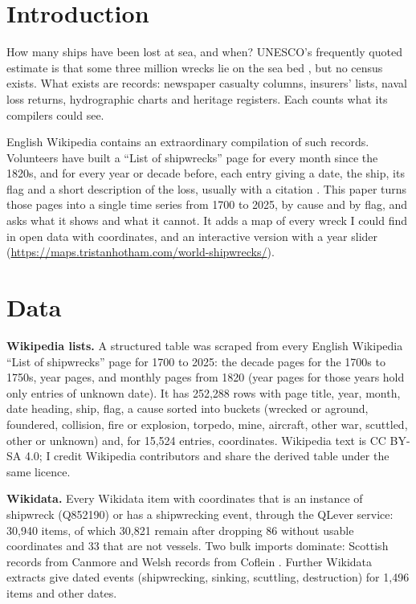 \documentclass[11pt,a4paper]{article}
\begin{document}
\section{Introduction}
How many ships have been lost at sea, and when? UNESCO's frequently quoted estimate is that some three million wrecks lie on the sea bed \citep{unesco}, but no census exists. What exists are records: newspaper casualty columns, insurers' lists, naval loss returns, hydrographic charts and heritage registers. Each counts what its compilers could see.

English Wikipedia contains an extraordinary compilation of such records. Volunteers have built a ``List of shipwrecks'' page for every month since the 1820s, and for every year or decade before, each entry giving a date, the ship, its flag and a short description of the loss, usually with a citation \citep{wikilists}. This paper turns those pages into a single time series from 1700 to 2025, by cause and by flag, and asks what it shows and what it cannot. It adds a map of every wreck I could find in open data with coordinates, and an interactive version with a year slider (\url{https://maps.tristanhotham.com/world-shipwrecks/}).

\section{Data}
\textbf{Wikipedia lists.} A structured table was scraped from every English Wikipedia ``List of shipwrecks'' page for 1700 to 2025: the decade pages for the 1700s to 1750s, year pages, and monthly pages from 1820 (year pages for those years hold only entries of unknown date). It has 252,288 rows with page title, year, month, date heading, ship, flag, a cause sorted into buckets (wrecked or aground, foundered, collision, fire or explosion, torpedo, mine, aircraft, other war, scuttled, other or unknown) and, for 15,524 entries, coordinates. Wikipedia text is CC BY-SA 4.0; I credit Wikipedia contributors and share the derived table under the same licence.

\textbf{Wikidata.} Every Wikidata \citep{wikidata} item with coordinates that is an instance of shipwreck (Q852190) or has a shipwrecking event, through the QLever service: 30,940 items, of which 30,821 remain after dropping 86 without usable coordinates and 33 that are not vessels. Two bulk imports dominate: Scottish records from Canmore \citep{canmore} and Welsh records from Coflein \citep{coflein}. Further Wikidata extracts give dated events (shipwrecking, sinking, scuttling, destruction) for 1,496 items and other dates.
\end{document}
